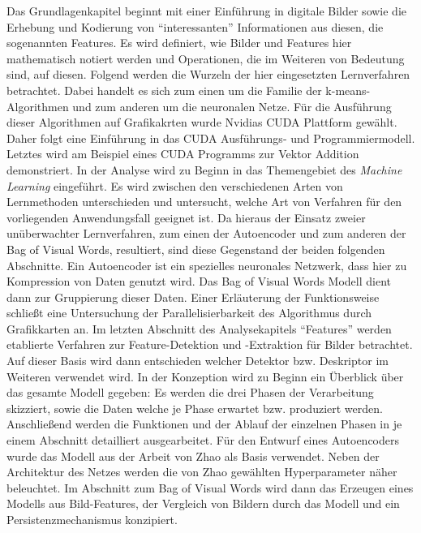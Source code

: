 Das Grundlagenkapitel beginnt mit einer Einführung in digitale Bilder sowie die Erhebung und Kodierung von \enquote{interessanten} Informationen aus diesen, die sogenannten Features. Es wird definiert, wie Bilder und Features hier mathematisch notiert werden und Operationen, die im Weiteren von Bedeutung sind, auf diesen. Folgend werden die Wurzeln der hier eingesetzten Lernverfahren betrachtet. Dabei handelt es sich zum einen um die Familie der k-means-Algorithmen und zum anderen um die neuronalen Netze. Für die Ausführung dieser Algorithmen auf Grafikakrten wurde Nvidias CUDA Plattform gewählt. Daher folgt eine Einführung in das CUDA Ausführungs- und Programmiermodell. Letztes wird am Beispiel eines CUDA Programms zur Vektor Addition demonstriert.\newline
In der Analyse wird zu Beginn in das Themengebiet des \textit{Machine Learning} eingeführt. Es wird zwischen den verschiedenen Arten von Lernmethoden unterschieden und untersucht, welche Art von Verfahren für den vorliegenden Anwendungsfall geeignet ist. Da hieraus der Einsatz zweier unüberwachter Lernverfahren, zum einen der Autoencoder und zum anderen der Bag of Visual Words, resultiert, sind diese Gegenstand der beiden folgenden Abschnitte. Ein Autoencoder ist ein spezielles neuronales Netzwerk, dass hier zu Kompression von Daten genutzt wird. Das Bag of Visual Words Modell dient dann zur Gruppierung dieser Daten. Einer Erläuterung der Funktionsweise schließt eine Untersuchung der Parallelisierbarkeit des Algorithmus durch Grafikkarten an. Im letzten Abschnitt des Analysekapitels \enquote{Features} werden etablierte Verfahren zur Feature-Detektion und -Extraktion für Bilder betrachtet. Auf dieser Basis wird dann entschieden welcher Detektor bzw. Deskriptor im Weiteren verwendet wird. \newline
In der Konzeption wird zu Beginn ein Überblick über das gesamte Modell gegeben: Es werden die drei Phasen der Verarbeitung skizziert, sowie die Daten welche je Phase erwartet bzw. produziert werden. Anschließend werden die Funktionen und der Ablauf der einzelnen Phasen in je einem Abschnitt detailliert ausgearbeitet. Für den Entwurf eines Autoencoders wurde das Modell aus der Arbeit von Zhao \cite{aed2016} als Basis verwendet. Neben der Architektur des Netzes werden die von Zhao gewählten Hyperparameter näher beleuchtet. Im Abschnitt zum Bag of Visual Words wird dann das Erzeugen eines Modells aus Bild-Features, der Vergleich von Bildern durch das Modell und ein Persistenzmechanismus konzipiert. \newline
